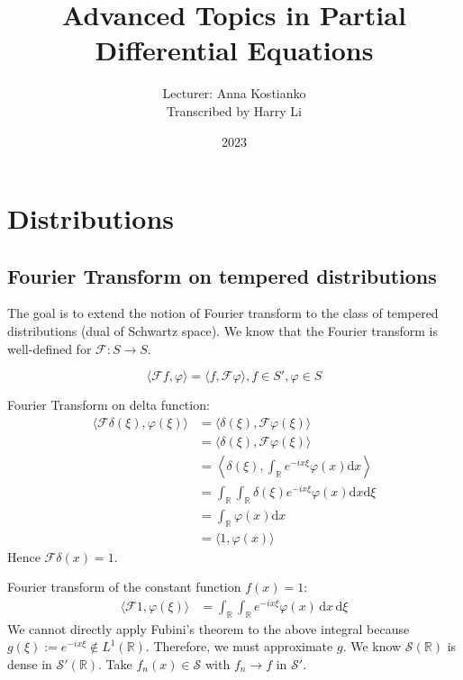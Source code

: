 \documentclass{report}
\title{\Huge{Advanced Topics in Partial Differential Equations}}
\author{Lecturer: Anna Kostianko \\ Transcribed by Harry Li}
\date{2023}
\begin{document}

\newpage

\tableofcontents

\chapter{Distributions}
\section{Fourier Transform on tempered distributions}
The goal is to extend the notion of Fourier transform to the class of tempered distributions (dual of Schwartz space). We know that the Fourier transform is well-defined for \(\mathcal{F}: S \rightarrow S\).

\[\langle \mathcal{F}f, \varphi \rangle = \langle f, \mathcal{F} \varphi \rangle, f \in S', \varphi \in S\]

\begin{example}{}{}
    Fourier Transform on delta function:
    \begin{align*}
        \langle \mathcal{F}\delta(\xi), \varphi(\xi) \rangle &= \langle \delta(\xi), \mathcal{F} \varphi(\xi) \rangle \\
        &= \langle \delta(\xi), \mathcal{F}\varphi(\xi) \rangle \\
        &= \left\langle \delta(\xi), \int_{\mathbb{R}} e^{-ix\xi}\varphi(x) \mathrm{d}x \right\rangle \\
        &= \int_{\mathbb{R}} \int_{\mathbb{R}} \delta(\xi) e^{-ix\xi}\varphi(x) \mathrm{d}x \mathrm{d}\xi \\
        &= \int_{\mathbb{R}} \varphi(x) \mathrm{d}x \\
        &= \langle 1, \varphi(x) \rangle
    \end{align*}
    Hence $\mathcal{F} \delta(x) = 1$.
\end{example}

\begin{example}{}{}
    Fourier transform of the constant function $f(x)=1$:
    \begin{align*}
        \langle \mathcal{F}1, \varphi(\xi) \rangle &= \int_{\mathbb{R}} \int_{\mathbb{R}} e^{-ix\xi}\varphi(x)\,\mathrm{d}x\,\mathrm{d}\xi
    \end{align*}
    We cannot directly apply Fubini's theorem to the above integral because $g(\xi) := e^{-ix\xi} \notin L^1(\mathbb{R})$. Therefore, we must approximate $g$. We know $\mathcal{S}(\mathbb{R})$ is dense in $\mathcal{S'}(\mathbb{R})$. Take $f_{n}(x) \in \mathcal{S}$ with $f_{n} \rightarrow f$ in $\mathcal{S}'$.
\end{example}
\end{document}
